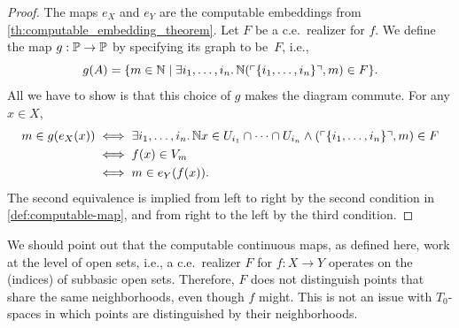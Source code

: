 
\begin{proof}
  The maps $e_X$ and $e_Y$ are the computable embeddings from
  \cref{th:computable_embedding_theorem}. Let $F$ be a
  c.e.~realizer for $f$. We define the map $g: \mathbb{P} \to \mathbb{P}$ by
  specifying its graph to be~$F$, i.e.,
  \begin{equation*}
    g(A) = \{m \in \mathbb{N} \mid
      \exists i_1, \ldots, i_n .\,{\mathbb{N}}{
        (\ulcorner \{i_1, \ldots, i_n\} \urcorner, m) \in F
      }\}.
  \end{equation*}
  All we have to show is that this choice of $g$ makes the diagram
  commute. For any $x \in X$,
  \begin{align*}
    m \in g(e_X(x)) &\iff
      \exists i_1, \ldots, i_n .\,{\mathbb{N}}{
        x \in U_{i_1} \cap \cdots \cap U_{i_n} \land
        (\ulcorner \{i_1, \ldots, i_n\} \urcorner, m) \in F
      } \\
      &\iff
      f(x) \in V_m
      \\
      &\iff
      m \in e_Y(f(x)).
  \end{align*}
  The second equivalence is implied from left to right by the second
  condition in \cref{def:computable-map}, and from right to
  the left by the third condition.
\end{proof}

We should point out that the computable continuous maps, as defined
here, work at the level of open sets, i.e., a c.e.~realizer $F$ for $f
: X \to Y$ operates on the (indices) of subbasic open sets. Therefore,
$F$ does not distinguish points that share the same neighborhoods,
even though $f$ might. This is not an issue with $T_0$-spaces in which
points are distinguished by their neighborhoods.


